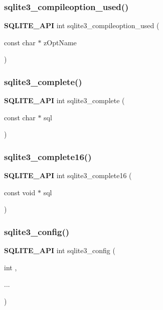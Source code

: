 \subsubsection{sqlite3\_compileoption\_used()}
{\footnotesize\ttfamily \textbf{ S\+Q\+L\+I\+T\+E\+\_\+\+A\+PI} int sqlite3\+\_\+compileoption\+\_\+used (\begin{DoxyParamCaption}\item[{const char $\ast$}]{z\+Opt\+Name }\end{DoxyParamCaption})}

\mbox{\label{sqlite3_8h_a9a7d40e747b5ba853756499b1e2d1198}} 
\subsubsection{sqlite3\_complete()}
{\footnotesize\ttfamily \textbf{ S\+Q\+L\+I\+T\+E\+\_\+\+A\+PI} int sqlite3\+\_\+complete (\begin{DoxyParamCaption}\item[{const char $\ast$}]{sql }\end{DoxyParamCaption})}

\mbox{\label{sqlite3_8h_a3260341c2ef82787acca48414a1d03a1}} 
\subsubsection{sqlite3\_complete16()}
{\footnotesize\ttfamily \textbf{ S\+Q\+L\+I\+T\+E\+\_\+\+A\+PI} int sqlite3\+\_\+complete16 (\begin{DoxyParamCaption}\item[{const void $\ast$}]{sql }\end{DoxyParamCaption})}

\mbox{\label{sqlite3_8h_a74ad420b6f26bc06a04ff6ecec8a8c91}} 
\subsubsection{sqlite3\_config()}
{\footnotesize\ttfamily \textbf{ S\+Q\+L\+I\+T\+E\+\_\+\+A\+PI} int sqlite3\+\_\+config (\begin{DoxyParamCaption}\item[{int}]{,  }\item[{}]{... }\end{DoxyParamCaption})}

